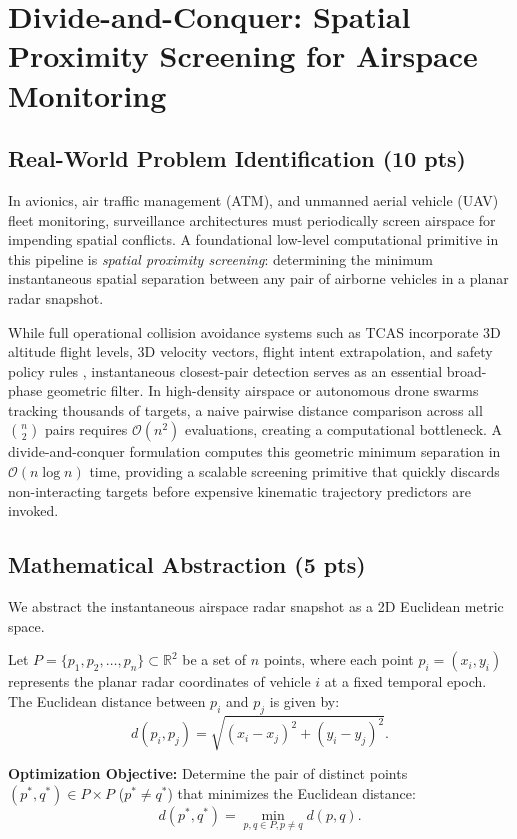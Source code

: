 \section{Divide-and-Conquer: Spatial Proximity Screening for Airspace Monitoring}

\subsection{Real-World Problem Identification (10 pts)}
In avionics, air traffic management (ATM), and unmanned aerial vehicle (UAV) fleet monitoring, surveillance architectures must periodically screen airspace for impending spatial conflicts. A foundational low-level computational primitive in this pipeline is \textit{spatial proximity screening}: determining the minimum instantaneous spatial separation between any pair of airborne vehicles in a planar radar snapshot. 

While full operational collision avoidance systems such as TCAS incorporate 3D altitude flight levels, 3D velocity vectors, flight intent extrapolation, and safety policy rules \cite{kuchar2000review}, instantaneous closest-pair detection serves as an essential broad-phase geometric filter. In high-density airspace or autonomous drone swarms tracking thousands of targets, a naive pairwise distance comparison across all $\binom{n}{2}$ pairs requires $\mathcal{O}(n^2)$ evaluations, creating a computational bottleneck. A divide-and-conquer formulation computes this geometric minimum separation in $\mathcal{O}(n \log n)$ time, providing a scalable screening primitive that quickly discards non-interacting targets before expensive kinematic trajectory predictors are invoked.

\subsection{Mathematical Abstraction (5 pts)}
We abstract the instantaneous airspace radar snapshot as a 2D Euclidean metric space.
\begin{definition}
Let $P = \{p_1, p_2, \dots, p_n\} \subset \mathbb{R}^2$ be a set of $n$ points, where each point $p_i = (x_i, y_i)$ represents the planar radar coordinates of vehicle $i$ at a fixed temporal epoch. The Euclidean distance between $p_i$ and $p_j$ is given by:
\begin{equation}
d(p_i, p_j) = \sqrt{(x_i - x_j)^2 + (y_i - y_j)^2}.
\end{equation}
\end{definition}
\textbf{Optimization Objective:} Determine the pair of distinct points $(p^*, q^*) \in P \times P$ ($p^* \neq q^*$) that minimizes the Euclidean distance:
\begin{equation}
d(p^*, q^*) = \min_{p, q \in P, p \neq q} d(p, q).
\end{equation}


